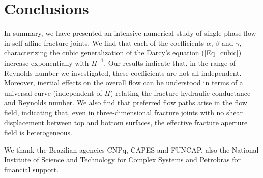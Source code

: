 \documentclass[aps,pre,
superscriptaddress,
twocolumn,
notitlepage,
10pt,
]{revtex4-1}
\begin{document}
\section{Conclusions}\label{conclusion}

In summary, we have presented an intensive numerical study of single-phase flow in
self-affine fracture joints. We find that each of the coefficients $\alpha$,
$\beta$ and $\gamma$, characterizing the cubic generalization of the Darcy's
equation (\ref{Eq_cubic}) increase exponentially with $H^{-1}$. Our results
indicate that, in the range of Reynolds number  we investigated, these
coefficients are not all independent. Moreover,  inertial effects on the
overall flow can be understood in terms of a universal curve (independent of
$H$) relating the fracture hydraulic conductance and Reynolds number. We
also find that preferred flow paths arise in the flow field, indicating
that, even in three-dimensional fracture joints with no shear displacement
between top and bottom surfaces, the effective fracture aperture field is
heterogeneous.


\begin{acknowledgments}
	We thank the Brazilian agencies CNPq, CAPES and FUNCAP, also the National
	Institute of Science and Technology for Complex Systems and Petrobras for
	financial support. 
\end{acknowledgments}

    
\end{document}
